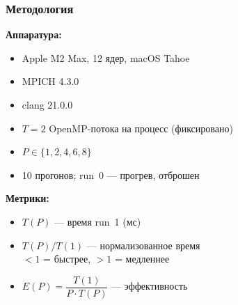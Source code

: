 \documentclass[aspectratio=169]{beamer}
\begin{document}
\begin{frame}
  \frametitle{Методология}
  \textbf{Аппаратура:}
  \begin{itemize}
	\item Apple M2 Max, 12 ядер, macOS Tahoe
	\item MPICH 4.3.0
	\item clang 21.0.0
	\item $T = 2$ OpenMP-потока на процесс (фиксировано)
	\item $P \in \{1, 2, 4, 6, 8\}$
	\item 10 прогонов; run~0 --- прогрев, отброшен
  \end{itemize}

  \medskip
  \textbf{Метрики:}
  \begin{itemize}
	\item $T(P)$ --- время run~1 (мс)
	\item $T(P)/T(1)$ --- нормализованное время\\
		  {\small $< 1$ = быстрее, $> 1$ = медленнее}
	\item $E(P) = \dfrac{T(1)}{P \cdot T(P)}$ --- эффективность
  \end{itemize}
\end{frame}

\end{document}
